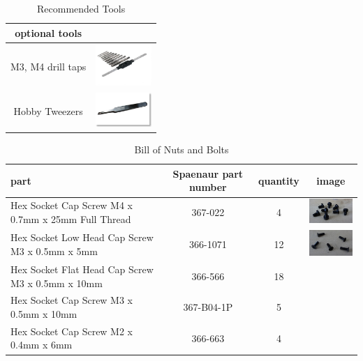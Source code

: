 \documentclass[12pt,titlepage,oneside]{memoir}
\begin{document}
\begin{table}[!h]
\begin{tabular}{c | c}
\hline
optional tools & \\
\hline
M3, M4 drill taps  & \includegraphics[width=80px]{picture/taps.jpg}\\
Hobby Tweezers & \includegraphics[width=80px]{picture/tweezer.jpg}
\end{tabular}
\caption{Recommended Tools}
\label{table:tools}
\end{table}


\begin{table}[!h]
\begin{tabular}{p{5cm} | c | c | c }
part & Spaenaur part number & quantity & image \\
\hline
Hex Socket Cap Screw M4 x 0.7mm x 25mm Full Thread & 367-022 & 4 & \includegraphics[width=80px]{hw/M3X06LHC.jpg}\\
Hex Socket Low Head Cap Screw M3 x 0.5mm x 5mm	& 366-1071 & 12 & \includegraphics[width=80px]{hw/M3X10FC.jpg}\\
Hex Socket Flat Head Cap Screw M3 x 0.5mm x 10mm & 366-566 & 18 & \\
Hex Socket Cap Screw M3 x 0.5mm x 10mm & 367-B04-1P	& 5 & \\
Hex Socket Cap Screw M2 x 0.4mm x 6mm	& 366-663 & 4 & \\
\end{tabular}
\caption{Bill of Nuts and Bolts}
\label{table:screws}
\end{table}
\end{document}
